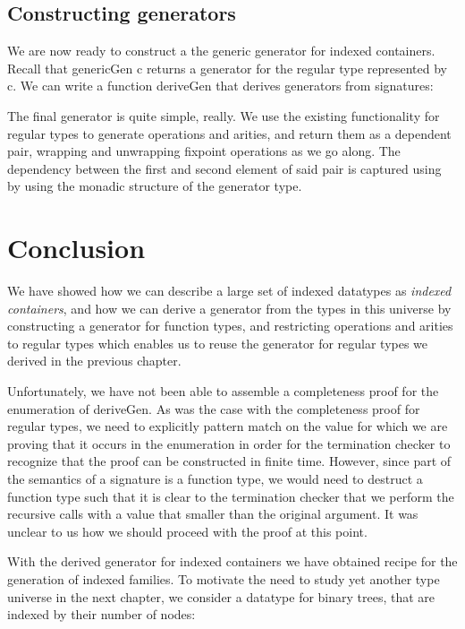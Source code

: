 \documentclass[a4paper,msc,twosized=semi]{uustthesis}
\let\oldemph\emph
\renewcommand\emph[1]{{\large\oldemph{#1}}}
\newcommand{\agda}[1]{{\agdafontinline\color{agdacolor}#1}}
\newcommand{\includeagda}[2]{\vspace*{-0.25cm}\begin{center}{\fontsize{12}{14}\agdafont\ExecuteMetaData[../src/chap0#1/latex/code.tex]{#2}}\end{center}\vspace*{-0.25cm}}
\begin{document}
\subsection{Constructing generators}

  We are now ready to construct a the generic generator for indexed containers. 
  Recall that \agda{genericGen c} returns a generator for the regular type represented by \agda{
  c}. We can write a function \agda{deriveGen} that derives generators from signatures:

\includeagda{6}{gensignature}

  The final generator is quite simple, really. We use the existing functionality for 
  regular types to generate operations and arities, and return them as a dependent 
  pair, wrapping and unwrapping fixpoint operations as we go along. The dependency 
  between the first and second element of said pair is captured using by using the 
  monadic structure of the generator type.

\section*{Conclusion}\label{sec:stree}

  We have showed how we can describe a large set of indexed datatypes as \emph{indexed 
  containers}, and how we can derive a generator from the types in this universe by 
  constructing a generator for function types, and restricting operations and arities 
  to regular types which enables us to reuse the generator for regular types we 
  derived in the previous chapter. 

  Unfortunately, we have not been able to assemble a completeness proof for the 
  enumeration of \agda{deriveGen}. As was the case with the completeness 
  proof for regular types, we need to explicitly pattern match on the value for which 
  we are proving that it occurs in the enumeration in order for the termination 
  checker to recognize that the proof can be constructed in finite time. However, 
  since part of the semantics of a signature is a function type, we would need 
  to destruct a function type such that it is clear to the termination checker
  that we perform the recursive calls with a value that smaller than the original
  argument. It was unclear to us how we should proceed with the proof at this point. 

  With the derived generator for indexed containers we have obtained recipe 
  for the generation of indexed families. To motivate the need to study yet 
  another type universe in the next chapter, we consider a datatype for 
  binary trees, that are indexed by their number of nodes: 
\end{document}
